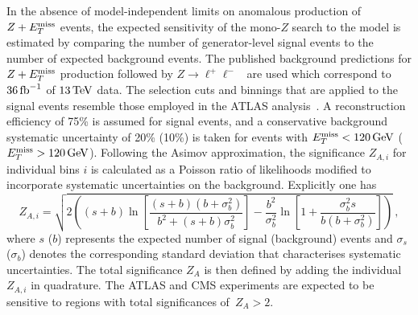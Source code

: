 In the absence of model-independent limits on anomalous production of $Z + E_T^\mathrm{miss}$ events, the expected sensitivity of the mono-$Z$ search to the \hdma model is estimated by comparing the number of generator-level signal events to the number of expected background events. The published background predictions for $Z+E_T^\mathrm{miss}$ production followed by $Z \to \ell^+ \ell^-$~\cite{Aaboud:2017bja} are used which correspond to $36 \, {\rm fb}^{-1}$ of $13 \, {\rm TeV}$ data. The selection cuts and \MET binnings that are applied to the signal events resemble those employed in the ATLAS analysis~\cite{Aaboud:2017bja}. A reconstruction efficiency of 75\% is assumed for signal events,  and a conservative background systematic uncertainty of 20\% (10\%) is taken for events with $E_T^\mathrm{miss} < 120  \, {\rm GeV}$ ($E_T^\mathrm{miss} > 120  \, {\rm GeV}$). Following the Asimov approximation, the significance $Z_{A,i}$ for individual bins $i$ is calculated as a Poisson ratio of likelihoods modified to incorporate systematic uncertainties on the background. Explicitly one has \cite{Cowan:2012}
\begin{equation}
\label{eq:significance_wsyst}
Z_{A, i} = \sqrt{ 2 \left ( \left ( s + b \right ) \ln \left [ \frac{\left (s+b \right ) \left (b + \sigma_b^2 \right )}{b^2 + \left ( s +b \right ) \sigma_b^2 } \right ]  - \frac{b^2}{\sigma_b^2} \ln \left [ 1 + \frac{\sigma_b^2 s}{b \left ( b + \sigma_b^2 \right )} \right ] \right ) } \,, 
\end{equation}
where $s$ ($b$) represents the expected number of signal (background) events and $\sigma_s$ ($ \sigma_b$) denotes the corresponding standard deviation that characterises systematic uncertainties. The total significance $Z_A$ is then defined by adding the individual $Z_{A, i}$ in quadrature. The ATLAS and CMS experiments are expected to be sensitive to regions with total significances of~$Z_A > 2$. %
 
